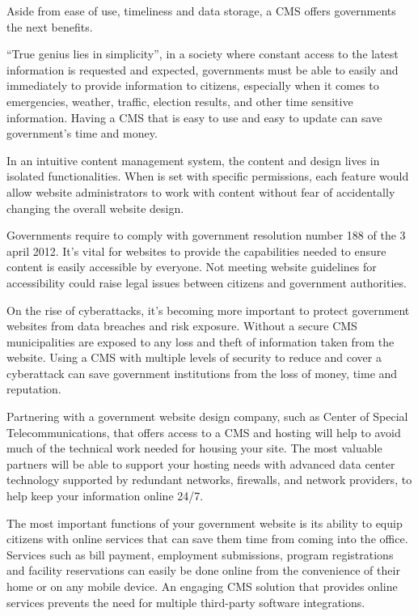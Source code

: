 Aside from ease of use, timeliness and data storage, a CMS offers governments the next benefits.

“True genius lies in simplicity”, in a society where constant access to the latest information is requested and expected, governments must be able to easily and immediately to provide information to citizens, especially when it comes to emergencies, weather, traffic, election results, and other time sensitive information. Having a CMS that is easy to use and easy to update can save government’s time and money. 

In an intuitive content management system, the content and design lives in isolated functionalities. When is set with specific permissions, each feature would allow website administrators to work with content without fear of accidentally changing the overall website design.

Governments require to comply with government resolution number 188 of the 3 april 2012. It's vital for websites to provide the capabilities needed to ensure content is easily accessible by everyone. Not meeting website guidelines for accessibility could raise legal issues between citizens and government authorities.

On the rise of cyberattacks, it's becoming more important to protect government websites from data breaches and risk exposure. Without a secure CMS municipalities are exposed to any loss and theft of information taken from the website. Using a CMS with multiple levels of security to reduce and cover a cyberattack can save government institutions from the loss of money, time and reputation. 

Partnering with a government website design company, such as Center of Special Telecommunications, that offers access to a CMS and hosting will help to avoid much of the technical work needed for housing your site. The most valuable partners will be able to support your hosting needs with advanced data center technology supported by redundant networks, firewalls, and network providers, to help keep your information online 24/7.

The most important functions of your government website is its ability to equip citizens with online services that can save them time from coming into the office. Services such as bill payment, employment submissions, program registrations and facility reservations can easily be done online from the convenience of their home or on any mobile device. An engaging CMS solution that provides online services prevents the need for multiple third-party software integrations.

